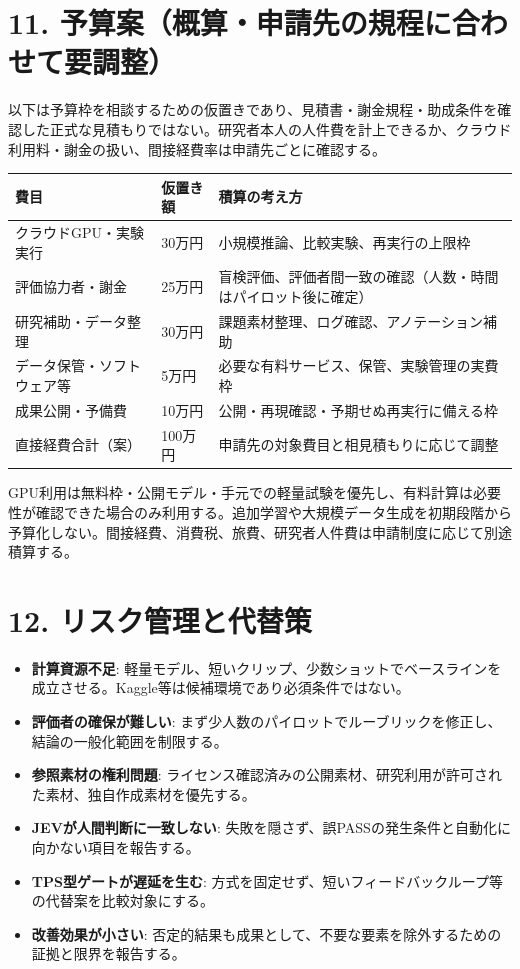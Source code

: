 \documentclass[11pt,a4paper]{article}
\begin{document}
\section*{11. 予算案（概算・申請先の規程に合わせて要調整）}
以下は予算枠を相談するための仮置きであり、見積書・謝金規程・助成条件を確認した正式な見積もりではない。研究者本人の人件費を計上できるか、クラウド利用料・謝金の扱い、間接経費率は申請先ごとに確認する。
\begin{center}
\begin{tabularx}{\linewidth}{p{37mm}p{20mm}X}
\toprule
費目 & 仮置き額 & 積算の考え方 \\
\midrule
クラウドGPU・実験実行 & 30万円 & 小規模推論、比較実験、再実行の上限枠 \\
評価協力者・謝金 & 25万円 & 盲検評価、評価者間一致の確認（人数・時間はパイロット後に確定） \\
研究補助・データ整理 & 30万円 & 課題素材整理、ログ確認、アノテーション補助 \\
データ保管・ソフトウェア等 & 5万円 & 必要な有料サービス、保管、実験管理の実費枠 \\
成果公開・予備費 & 10万円 & 公開・再現確認・予期せぬ再実行に備える枠 \\
\midrule
直接経費合計（案） & 100万円 & 申請先の対象費目と相見積もりに応じて調整 \\
\bottomrule
\end{tabularx}
\end{center}
GPU利用は無料枠・公開モデル・手元での軽量試験を優先し、有料計算は必要性が確認できた場合のみ利用する。追加学習や大規模データ生成を初期段階から予算化しない。間接経費、消費税、旅費、研究者人件費は申請制度に応じて別途積算する。

\section*{12. リスク管理と代替策}
\begin{itemize}[nosep]
\item \textbf{計算資源不足}: 軽量モデル、短いクリップ、少数ショットでベースラインを成立させる。Kaggle等は候補環境であり必須条件ではない。
\item \textbf{評価者の確保が難しい}: まず少人数のパイロットでルーブリックを修正し、結論の一般化範囲を制限する。
\item \textbf{参照素材の権利問題}: ライセンス確認済みの公開素材、研究利用が許可された素材、独自作成素材を優先する。
\item \textbf{JEVが人間判断に一致しない}: 失敗を隠さず、誤PASSの発生条件と自動化に向かない項目を報告する。
\item \textbf{TPS型ゲートが遅延を生む}: 方式を固定せず、短いフィードバックループ等の代替案を比較対象にする。
\item \textbf{改善効果が小さい}: 否定的結果も成果として、不要な要素を除外するための証拠と限界を報告する。
\end{itemize}
\end{document}
